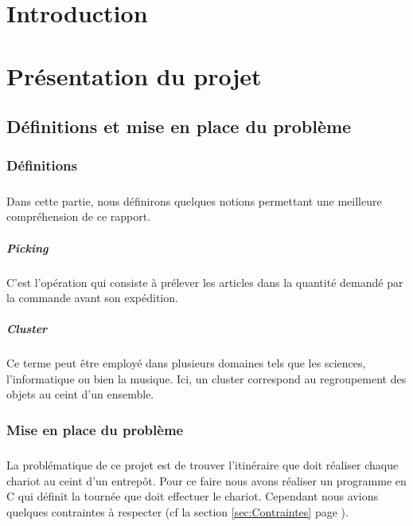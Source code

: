 \documentclass[twoside,UTF8]{EPURapport}
\begin{document}

\chapter{Introduction}


\chapter{Présentation du projet}

\section{Définitions et mise en place du problème}
\subsection{Définitions}
\paragraph{}Dans cette partie, nous définirons quelques notions permettant une meilleure compréhension de ce rapport.

\paragraph{Picking} C'est l'opération qui consiste à prélever les articles dans la quantité demandé par la commande avant son expédition.

\paragraph{Cluster} Ce terme peut être employé dans plusieurs domaines tels que les sciences, l'informatique ou bien la musique. Ici, un cluster correspond au regroupement des objets au ceint d'un ensemble.

\subsection{Mise en place du problème }
\paragraph{}La problématique de ce projet est de trouver l'itinéraire que doit réaliser chaque chariot au ceint d'un entrepôt. Pour ce faire nous avons réaliser un programme en C qui définit la tournée que doit effectuer le chariot. Cependant nous avions quelques contraintes à respecter (cf la section \ref{sec:Contraintes} page \pageref{sec:Contraintes}). 
\end{document}
